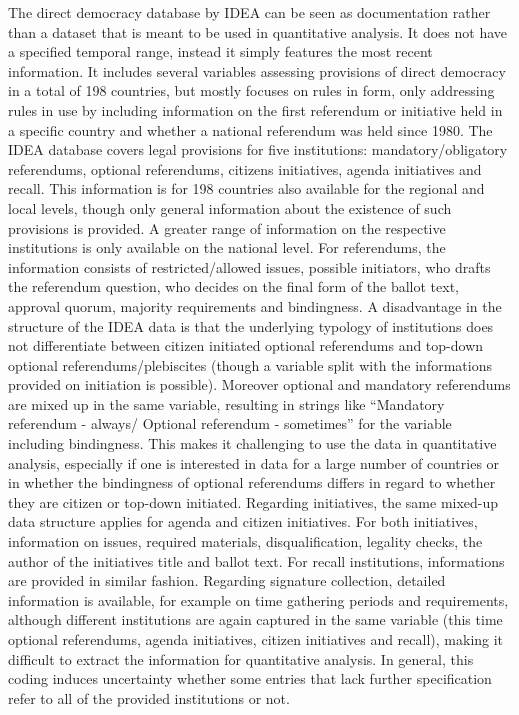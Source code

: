 \documentclass{systats}
\begin{document}
The direct democracy database by IDEA can be seen as documentation rather than a dataset that is meant to be used in quantitative analysis. It does not have a specified temporal range, instead it simply features the most recent information. It includes several variables assessing provisions of direct democracy in a total of 198 countries, but mostly focuses on rules in form, only addressing rules in use by including information on the first referendum or initiative held in a specific country and whether a national referendum was held since 1980. The IDEA database covers legal provisions for five institutions: mandatory/obligatory referendums, optional referendums, citizens initiatives, agenda initiatives and recall. This information is for 198 countries also available for the regional and local levels, though only general information about the existence of such provisions is provided. A greater range of information on the respective institutions is only available on the national level. For referendums, the information consists of restricted/allowed issues, possible initiators, who drafts the referendum question, who decides on the final form of the ballot text, approval quorum, majority requirements and bindingness. A disadvantage in the structure of the IDEA data is that the underlying typology of institutions does not differentiate between citizen initiated optional referendums and top-down optional referendums/plebiscites (though a variable split with the informations provided on initiation is possible). Moreover optional and mandatory referendums are mixed up in the same variable, resulting in strings like “Mandatory referendum - always/ Optional referendum - sometimes” for the variable including bindingness. This makes it challenging to use the data in quantitative analysis, especially if one is interested in data for a large number of countries or in whether the bindingness of optional referendums differs in regard to whether they are citizen or top-down initiated. Regarding initiatives, the same mixed-up data structure applies for agenda and citizen initiatives. For both initiatives, information on issues, required materials, disqualification, legality checks, the author of the initiatives title and ballot text. For recall institutions, informations are provided in similar fashion. Regarding signature collection, detailed information is available, for example on time gathering periods and  requirements, although different institutions are again captured in the same variable (this time optional referendums, agenda initiatives, citizen initiatives and recall), making it difficult to extract the information for quantitative analysis. In general, this coding induces uncertainty whether some entries that lack further specification refer to all of the provided institutions or not.
\end{document}
